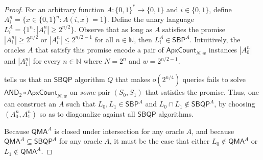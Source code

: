 \documentclass[10pt,a4paper]{article}
\newcommand{\<}{\langle}
\renewcommand{\>}{\rangle}
\newcommand{\ApxCount}{\mathsf{ApxCount}_{N,w}}
\newcommand{\AndApxCount}{\mathsf{AND}_2\circ\mathsf{ApxCount}_{N,w}}
\begin{document}
\begin{proof}
For an arbitrary function $A: \{0,1\}^* \to \{0,1\}$ and $i \in \{0,1\}$, define $A_i^n = \{x \in \{0,1\}^n : A(i, x) = 1\}$. Define the unary language $L^A_i = \{1^n : |A_i^n| \ge 2^{n/2}\}$. Observe that as long as $A$ satisfies the promise $|A_i^n| \ge 2^{n/2}$ or $|A_i^n| \le 2^{n/2-1}$ for all $n \in \mathbb{N}$, then $L^A_i \in \mathsf{SBP}^A$. Intuitively, the oracles $A$ that satisfy this promise encode a pair of $\ApxCount$ instances $|A_0^n|$ and $|A_1^n|$ for every $n \in \mathbb{N}$ where $N = 2^n$ and $w = 2^{n/2 - 1}$.

 tells us that an $\mathsf{SBQP}$ algorithm $Q$ that makes $o(2^{n/4})$ queries fails to solve $\AndApxCount$ on \textit{some} pair $(S_0, S_1)$ that satisfies the promise. Thus, one can construct an $A$ such that $L_0, L_1 \in \mathsf{SBP}^A$ and $L_0 \cap L_1 \not\in \mathsf{SBQP}^A$, by choosing $(A_0^n, A_1^n)$ so as to diagonalize against all $\mathsf{SBQP}$ algorithms.

Because $\mathsf{QMA}^A$ is closed under intersection for any oracle $A$, and because $\mathsf{QMA}^A \subseteq \mathsf{SBQP}^A$ for any oracle $A$, it must be the case that either $L_0 \not\in \mathsf{QMA}^A$ or $L_1 \not\in \mathsf{QMA}^A$.
\end{proof}

%
%
%


%
\end{document}

